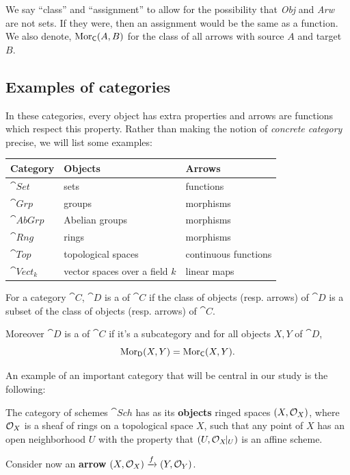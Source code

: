 \begin{Rmk}
We say ``class'' and ``assignment'' to allow for the possibility that \emph{Obj} and \emph{Arw} are not sets. If they were, then an assignment would be the same as a function. We also denote, \(\operatorname{Mor}_{\mathsf{C}}(A,B)\) for the class of all arrows with source \(A\) and target \(B\). 
\end{Rmk}

\subsection{Examples of categories}

\begin{Ex}
    In these categories, every object has extra properties and arrows are functions which respect this property. Rather than making the notion of \emph{concrete category} precise, we will list some examples:
    \begin{table}[h]
        \centering
        \begin{tabular}{lll}\toprule
            Category & Objects & Arrows\\ \midrule
            \(\cat{Set}\)& sets & functions\\
            \(\cat{Grp}\)& groups & morphisms\\
            \(\cat{AbGrp}\)&  Abelian groups & morphisms\\
            \(\cat{Rng}\)&  rings & morphisms\\
            \(\cat{Top}\)&  topological spaces & continuous functions\\
            \(\cat{Vect}_{k}\)&  vector spaces over a field \(k\) & linear maps\\
       \bottomrule
        \end{tabular}
        \end{table}
\end{Ex}

\begin{Def}
    For a category \(\cat{C}\), \(\cat{D}\) is a  of \(\cat{C}\) if the class of objects (resp. arrows) of \(\cat{D}\) is a subset of the class of objects (resp. arrows) of \(\cat{C}\).\par
    Moreover \(\cat{D}\) is a  of \(\cat{C}\) if it's a subcategory and for all objects \(X,Y\) of \(\cat{D}\), 
    \[
    \operatorname{Mor}_{\mathsf{D}}(X,Y)=\operatorname{Mor}_{\mathsf{C}}(X,Y).
    \]
\end{Def}

An example of an important category that will be central in our study is the following:

\begin{Ex}
    The category of schemes \(\cat{Sch}\) has as its \textbf{objects} ringed spaces \((X,\mathcal{O}_X)\), where \(\mathcal{O}_X\) is a sheaf of rings on a topological space \(X\), such that any point of \(X\) has an open neighborhood \(U\) with the property that \((U,\mathcal{O}_X\hspace{-1.5mm}\mid_U)\) is an affine scheme.\par
    Consider now an \textbf{arrow} \((X,\mathcal{O}_X)\xrightarrow{f} (Y,\mathcal{O}_Y)\).

\end{Ex}


